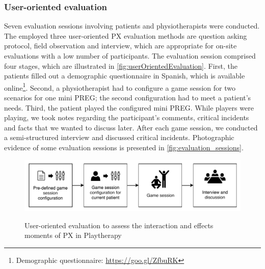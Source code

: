 \subsubsection{User-oriented evaluation}
Seven evaluation sessions involving patients and physiotherapists were conducted. The employed three user-oriented \ac{PX} evaluation methods are question asking protocol, field observation and interview, which are appropriate for on-site evaluations with a low number of participants. The evaluation session comprised four stages, which are illustrated in \autoref{fig:userOrientedEvaluation}. First, the patients filled out a demographic questionnaire in Spanish, which is available online\footnote{Demographic questionnaire: \url{https://goo.gl/ZfbuRK}}. Second, a physiotherapist had to configure a game session for two scenarios for one mini \ac{PREG}; the second configuration had to meet a patient's needs. Third, the patient played the configured mini \ac{PREG}. While players were playing, we took notes regarding the participant's comments, critical incidents and facts that we wanted to discuss later. After each game session, we conducted a semi-structured interview and discussed critical incidents. Photographic evidence of some evaluation sessions is presented in \autoref{fig:evaluation_sessions}.

\begin{figure}[bth]
\myfloatalign
{\includegraphics[width=.9\linewidth]{gfx/playtherapy/userOrientedEvaluation}} \quad
\caption{User-oriented evaluation to assess the interaction and effects moments of \ac{PX} in Playtherapy}
\label{fig:userOrientedEvaluation}
\end{figure}


